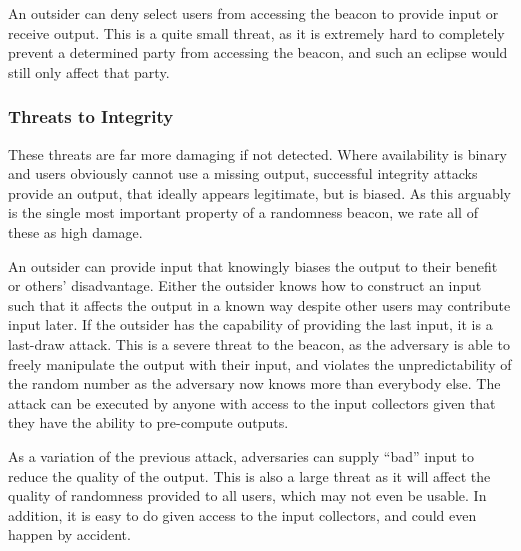 An outsider can deny select users from accessing the beacon to provide input or receive output.
This is a quite small threat, as it is extremely hard to completely prevent a determined party from accessing the beacon, and such an eclipse would still only affect that party.

\subsubsection{Threats to Integrity}
These threats are far more damaging if not detected. Where availability is binary and users obviously cannot use a missing output, successful integrity attacks provide an output, that ideally appears legitimate, but is biased. As this arguably is the single most important property of a randomness beacon, we rate all of these as high damage. 

An outsider can provide input that knowingly biases the output to their benefit or others' disadvantage.
Either the outsider knows how to construct an input such that it affects the output in a known way despite other users may contribute input later.
If the outsider has the capability of providing the last input, it is a last-draw attack.
This is a severe threat to the beacon, as the adversary is able to freely manipulate the output with their input, and violates the unpredictability of the random number as the adversary now knows more than everybody else.
The attack can be executed by anyone with access to the input collectors given that they have the ability to pre-compute outputs.

As a variation of the previous attack, adversaries can supply \enquote{bad} input to reduce the quality of the output.
This is also a large threat as it will affect the quality of randomness provided to all users, which may not even be usable.
In addition, it is easy to do given access to the input collectors, and could even happen by accident.

